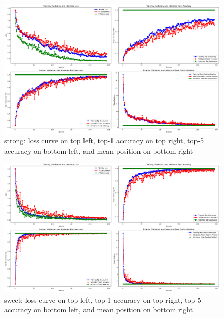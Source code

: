 \begin{figure}[H]
  \centering
  \includegraphics[scale=0.3]{figures/strong.png} 
  \caption{strong: loss curve on top left, top-1 accuracy on top right, top-5 accuracy on bottom left, and mean position on bottom right}
  \label{fig:strong_64}
\end{figure}

\begin{figure}[H]
  \centering
  \includegraphics[scale=0.23]{figures/sweet_bs64.png} 
  \caption{sweet: loss curve on top left, top-1 accuracy on top right, top-5 accuracy on bottom left, and mean position on bottom right}
  \label{fig:sweet_bs64}
\end{figure}

\vspace{-5mm} %

